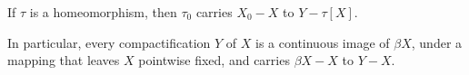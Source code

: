 If $\tau$ is a homeomorphism, then $\tau_0$ carries $X_0 - X$ to $Y - \tau[X]$.

In particular, every compactification $Y$ of $X$ is a continuous image of $\beta X$, under a mapping that leaves $X$ pointwise fixed, and carries $\beta X - X$ to $Y - X$.
